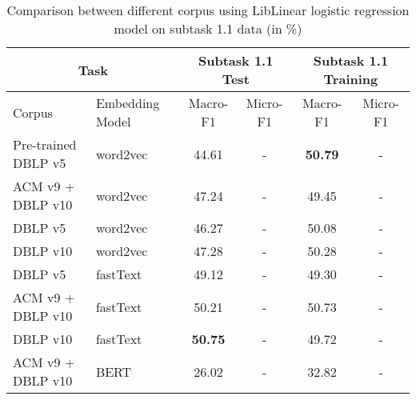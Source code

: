 \begin{table}[htbp!] %
    \centering
    \begin{tabular}{llcccc}
    \toprule
        \multicolumn{2}{c}{Task}          & \multicolumn{2}{c}{Subtask 1.1 Test} & \multicolumn{2}{c}{Subtask 1.1 Training} \\
    \midrule
        Corpus & Embedding Model          & Macro-F1         & Micro-F1       & Macro-F1         & Micro-F1       \\
    \midrule
        Pre-trained DBLP v5 & word2vec    & 44.61            & -              & \bf50.79         & -              \\
        ACM v9 + DBLP v10   & word2vec    & 47.24            & -              & 49.45            & -              \\
        DBLP v5             & word2vec    & 46.27            & -              & 50.08            & -              \\
        DBLP v10            & word2vec    & 47.28            & -              & 50.28            & -              \\
        DBLP v5             & fastText    & 49.12            & -              & 49.30            & -              \\
        ACM v9 + DBLP v10   & fastText    & 50.21            & -              & 50.73            & -              \\
        DBLP v10            & fastText    & \bf50.75         & -              & 49.72            & -              \\
        ACM v9 + DBLP v10   & BERT        & 26.02            & -              & 32.82            & -              \\
    \bottomrule
    \end{tabular}
\caption{Comparison between different corpus using LibLinear logistic regression model on subtask 1.1 data (in \%)}
\label{tab:embedding}
\end{table}
